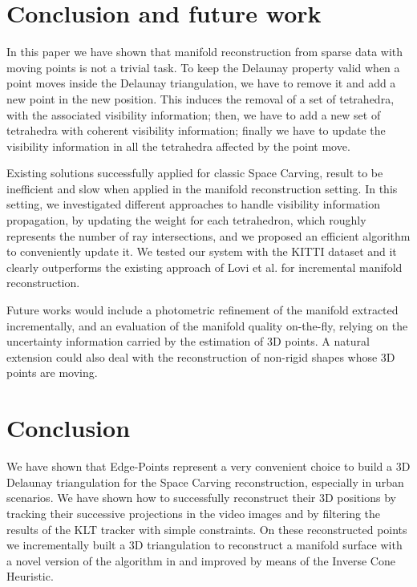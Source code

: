\section{Conclusion and future work}
\label{sec:conclusion}
In this paper we have shown that manifold reconstruction from sparse data with moving points is not a trivial task. To keep the Delaunay property valid when a point moves inside the Delaunay triangulation, we have to remove it and add a new point in the new position. This induces the removal of a set of tetrahedra, with the associated visibility information; then, we have to add a new set of tetrahedra with coherent visibility information; finally we have to update the visibility information in all the tetrahedra affected by the point move.

Existing solutions successfully applied for classic Space Carving, result to be inefficient and slow when applied in the manifold reconstruction setting. 
In this setting, we investigated different approaches to handle visibility information propagation, by updating the weight for each tetrahedron, which roughly represents  the number of ray intersections, and we proposed an efficient algorithm to conveniently update it. 
We tested our system with the KITTI dataset and it clearly outperforms the existing approach of Lovi et al. \cite{lovi_et_al_11} for incremental manifold reconstruction.

Future works would include a photometric refinement of the manifold extracted incrementally, and an evaluation of the manifold quality on-the-fly, relying on the uncertainty information carried by the estimation of 3D points. 
A natural extension could also deal with the reconstruction of non-rigid shapes whose 3D points are moving.




\section{Conclusion}
\label{sec:conclusion}
We have shown that Edge-Points represent a very convenient choice to build a 3D Delaunay triangulation for the Space Carving reconstruction, especially in urban scenarios.
We have shown how to successfully reconstruct their 3D positions by tracking their successive projections in the video images and by filtering the results of the KLT tracker with simple constraints. On these reconstructed points we incrementally built a 3D triangulation to reconstruct a manifold surface with a novel version of the algorithm in \cite{litvinov_lhuillier_13} and \cite{litvinov_Lhiuller14} improved by means of the Inverse Cone Heuristic.

